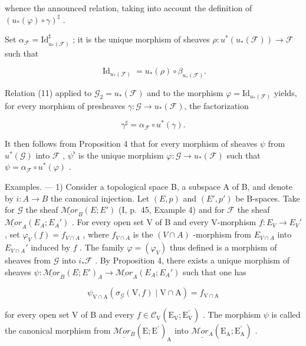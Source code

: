 whence the announced relation, taking into account the definition of \((u_{*}(\varphi)\circ\gamma)^{\sharp}\) .

Set \(\alpha_{\mathcal{F}} = \mathrm{Id}_{u_*(\mathcal{F})}^\sharp\) ; it is the unique morphism of sheaves \(\rho \colon u^*(u_*(\mathcal{F})) \to \mathcal{F}\) such that

\[
\operatorname{Id} _ {u _ {*} (\mathcal {F})} = u _ {*} (\rho) \circ \beta_ {u _ {*} (\mathcal {F})}.
\]

Relation (11) applied to \(\mathcal{G}_2 = u_*(\mathcal{F})\) and to the morphism \(\varphi = \mathrm{Id}_{u_*(\mathcal{F})}\) yields, for every morphism of presheaves \(\gamma\colon\mathcal{G}\to u_*(\mathcal{F})\), the factorization

\[
\gamma^ {\sharp} = \alpha_ {\mathcal {F}} \circ u ^ {*} (\gamma).
\]

It then follows from Proposition 4 that for every morphism of sheaves \(\psi\) from \(u^{*}(\mathcal{G})\) into \(\mathcal{F}\) , \(\psi^{\flat}\) is the unique morphism \(\varphi\colon\mathcal{G}\to u_{*}(\mathcal{F})\) such that \(\psi=\alpha_{\mathcal{F}}\circ u^{*}(\varphi)\) .

Examples. --- 1) Consider a topological space B, a subspace A of B, and denote by \(i\colon A \to B\) the canonical injection. Let \((E,p)\) and \((E',p')\) be B-spaces. Take for \(\mathcal{G}\) the sheaf \(\underline{\mathcal{M}or}_{B}(E;E')\) (I, p.~45, Example 4) and for \(\mathcal{F}\) the sheaf \(\underline{\mathcal{M}or}_{A}(E_{A};E_{A}')\) . For every open set V of B and every V-morphism \(f\colon E_{V} \to E_{V}'\) , set \(\varphi_{V}(f) = f_{V \cap A}\) , where \(f_{V \cap A}\) is the \((V \cap A)\) -morphism from \(E_{V \cap A}\) into \(E_{V \cap A}'\) induced by \(f\) . The family \(\varphi = (\varphi_{V})\) thus defined is a morphism of sheaves from \(\mathcal{G}\) into \(i_*\mathcal{F}\) . By Proposition 4, there exists a unique morphism of sheaves \(\psi\colon \underline{\mathcal{M}or}_{B}(E;E')_{A} \to \underline{\mathcal{M}or}_{A}(E_{A};E_{A}')\) such that one has

\[
\psi_ {\mathrm{V} \cap \mathrm{A}} (\sigma_ {\mathcal {G}} (\mathrm{V}, f) \mid \mathrm{V} \cap \mathrm{A}) = f _ {\mathrm{V} \cap \mathrm{A}}\tag{12}
\]

for every open set V of B and every \(f \in \mathcal{C}_{\mathrm{V}}(\mathrm{E}_{\mathrm{V}}; \mathrm{E}_{\mathrm{V}}^{\prime})\) . The morphism \(\psi\) is called the canonical morphism from \(\underline{\mathcal{M}or_{B}}(\mathrm{E}; \mathrm{E}^{\prime})_{\mathrm{A}}\) into \(\underline{\mathcal{M}or_{A}}(\mathrm{E}_{\mathrm{A}}; \mathrm{E}_{\mathrm{A}}^{\prime})\) .

